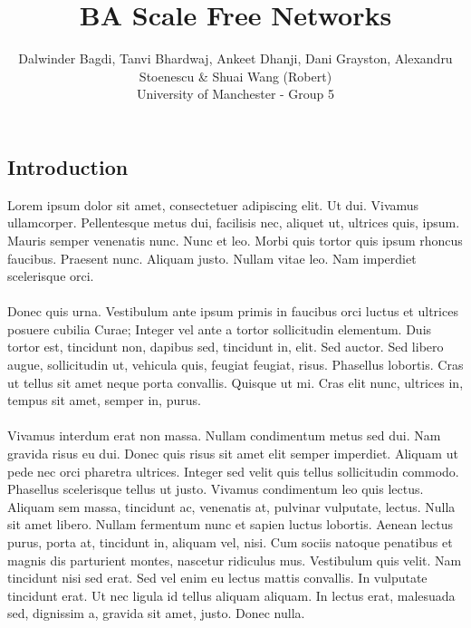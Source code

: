 \documentclass[a0,final]{a0poster}
\title{BA Scale Free Networks}
\author{Dalwinder Bagdi, Tanvi Bhardwaj, Ankeet Dhanji, Dani Grayston, Alexandru Stoenescu \& Shuai Wang (Robert)\\
University of Manchester - Group 5}
\begin{document}
\hspace{-3cm}								%
\colorbox{boxcol}{							%
\begin{minipage}{1189mm}					%
\maketitle
\end{minipage}}
\vspace{1cm}

\begin{multicols}{3}							%
\raggedcolumns							%

\section{Introduction}
Lorem ipsum dolor sit amet, consectetuer adipiscing elit. Ut dui. Vivamus ullamcorper. Pellentesque metus dui, facilisis nec, aliquet ut, ultrices quis, ipsum. Mauris semper venenatis nunc. Nunc et leo. Morbi quis tortor quis ipsum rhoncus faucibus. Praesent nunc. Aliquam justo. Nullam vitae leo. Nam imperdiet scelerisque orci.\\
\\
Donec quis urna. Vestibulum ante ipsum primis in faucibus orci luctus et ultrices posuere cubilia Curae; Integer vel ante a tortor sollicitudin elementum. Duis tortor est, tincidunt non, dapibus sed, tincidunt in, elit. Sed auctor. Sed libero augue, sollicitudin ut, vehicula quis, feugiat feugiat, risus. Phasellus lobortis. Cras ut tellus sit amet neque porta convallis. Quisque ut mi. Cras elit nunc, ultrices in, tempus sit amet, semper in, purus.\\
\\
Vivamus interdum erat non massa. Nullam condimentum metus sed dui. Nam gravida risus eu dui. Donec quis risus sit amet elit semper imperdiet. Aliquam ut pede nec orci pharetra ultrices. Integer sed velit quis tellus sollicitudin commodo. Phasellus scelerisque tellus ut justo. Vivamus condimentum leo quis lectus. Aliquam sem massa, tincidunt ac, venenatis at, pulvinar vulputate, lectus. Nulla sit amet libero. Nullam fermentum nunc et sapien luctus lobortis. Aenean lectus purus, porta at, tincidunt in, aliquam vel, nisi. Cum sociis natoque penatibus et magnis dis parturient montes, nascetur ridiculus mus. Vestibulum quis velit. Nam tincidunt nisi sed erat. Sed vel enim eu lectus mattis convallis. In vulputate tincidunt erat. Ut nec ligula id tellus aliquam aliquam. In lectus erat, malesuada sed, dignissim a, gravida sit amet, justo. Donec nulla.



\end{multicols}
\end{document}
